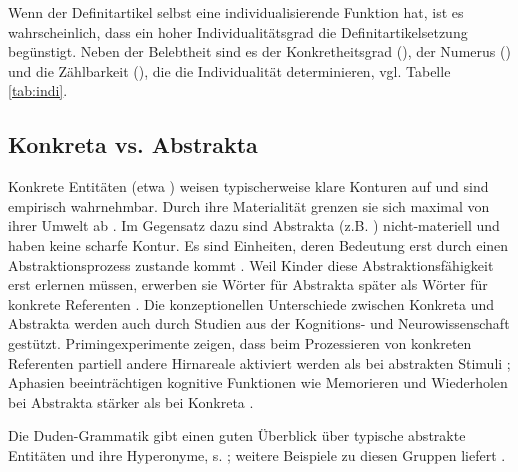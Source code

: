 \begin{exe}
	\ex \label{ex:unspez}
	\begin{xlist}
		\ex \label{ex:schule} 
		\ex \label{ex:dieschule} 
	\end{xlist}
\end{exe} 

Wenn der Definitartikel selbst eine individualisierende Funktion hat, ist es wahrscheinlich, dass ein hoher Individualitätsgrad die Definitartikelsetzung begünstigt. Neben der Belebtheit sind es der Konkretheitsgrad (), der Numerus () und die Zählbarkeit (), die 
die Individualität determinieren, vgl. Tabelle \ref{tab:indi}.

\subsection{Konkreta vs. Abstrakta}\label{sec:konabst}

Konkrete Entitäten (etwa ) weisen typischerweise klare Konturen auf und sind empirisch wahrnehmbar. Durch ihre Materialität grenzen sie sich maximal von ihrer Umwelt ab \parencite[344]{Szczepaniak2011}. Im Gegensatz dazu sind Abstrakta (z.B. ) nicht-materiell und haben keine scharfe Kontur. Es sind Einheiten, deren Bedeutung erst durch einen Abstraktionsprozess zustande kommt \parencite[279]{Ewald1992}. Weil Kinder diese Abstraktionsfähigkeit erst erlernen müssen, erwerben sie Wörter für Abstrakta später als Wörter für konkrete Referenten \parencite[396]{Bergelson2013}. Die konzeptionellen Unterschiede zwischen Konkreta und Abstrakta werden auch durch Studien aus der Kognitions- und Neurowissenschaft gestützt. Primingexperimente zeigen, dass beim Prozessieren von konkreten Referenten partiell andere Hirnareale aktiviert werden als bei abstrakten Stimuli \parencite{Binder2005,Weiss2013}; Aphasien beeinträchtigen kognitive Funktionen wie Memorieren und Wiederholen bei Abstrakta stärker als bei Konkreta \parencite{Moss1995,Moss1997}.

Die Duden-Grammatik gibt einen guten Überblick über typische abstrakte Entitäten und ihre Hyperonyme, s.  \parencite[146f.]{Duden2009}; weitere Beispiele zu diesen Gruppen liefert \textcite[143]{Schrauf2011}.

